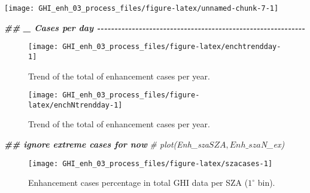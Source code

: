 \documentclass[
  10pt,
  a4paper,oneside]{article}
\newenvironment{Shaded}{\begin{snugshade}}{\end{snugshade}}
\newcommand{\CommentTok}[1]{\textcolor[rgb]{0.56,0.35,0.01}{\textit{#1}}}
\newcommand{\DocumentationTok}[1]{\textcolor[rgb]{0.56,0.35,0.01}{\textbf{\textit{#1}}}}
\begin{document}
\begin{center}\texttt{[image: GHI\_enh\_03\_process\_files/figure-latex/unnamed-chunk-7-1]} \end{center}

\begin{Shaded}
\begin{Highlighting}[]
\DocumentationTok{\#\# \_ Cases per day  {-}{-}{-}{-}{-}{-}{-}{-}{-}{-}{-}{-}{-}{-}{-}{-}{-}{-}{-}{-}{-}{-}{-}{-}{-}{-}{-}{-}{-}{-}{-}{-}{-}{-}{-}{-}{-}{-}{-}{-}{-}{-}{-}{-}{-}{-}{-}{-}{-}{-}{-}{-}{-}{-}{-}{-}{-}{-}{-}{-}}
\end{Highlighting}
\end{Shaded}

\begin{figure}

{\centering \texttt{[image: GHI\_enh\_03\_process\_files/figure-latex/enchtrendday-1]} 

}

\caption{Trend of the total of enhancement cases per year.}\label{fig:enchtrendday}
\end{figure}

\begin{figure}

{\centering \texttt{[image: GHI\_enh\_03\_process\_files/figure-latex/enchNtrendday-1]} 

}

\caption{Trend of the total of enhancement cases per year.}\label{fig:enchNtrendday}
\end{figure}

\begin{Shaded}
\begin{Highlighting}[]
\DocumentationTok{\#\# ignore extreme cases for now}
\CommentTok{\# plot(Enh\_sza$SZA, Enh\_sza$N\_ex)}
\end{Highlighting}
\end{Shaded}

\begin{figure}

{\centering \texttt{[image: GHI\_enh\_03\_process\_files/figure-latex/szacases-1]} 

}

\caption{Enhancement cases percentage in total GHI data per SZA ($1^\circ$ bin).}\label{fig:szacases}
\end{figure}
\end{document}
